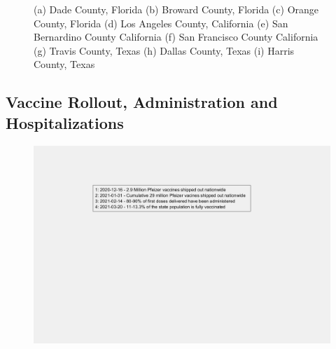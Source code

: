 \documentclass[]{article}
\begin{document}
\begin{figure}
	\caption{(a) Dade County, Florida (b) Broward County, Florida (c) Orange County, Florida (d) Los Angeles County, California (e) San Bernardino County California (f) San Francisco County California (g) Travis County, Texas (h) Dallas County, Texas (i) Harris County, Texas}
	\label{fig:foobar}
\end{figure}
\FloatBarrier
\vspace{5mm}

\subsection{Vaccine Rollout, Administration and Hospitalizations}

\begin{figure}[!h]
	\includegraphics[width=\linewidth]{legends/vaccine_rollout_legend.png}
	\caption{}
	\label{fig:legends/vaccine_rollout_legendLabel}
\end{figure}
\end{document}
